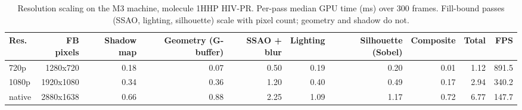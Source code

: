 \begin{table}[H]
    \centering
    \small
    \begin{tabular}{lrrrrrrrrr}
        \toprule
        Res. & FB pixels & Shadow map & Geometry (G-buffer) & SSAO + blur & Lighting & Silhouette (Sobel) & Composite & Total & FPS \\
        \midrule
        720p & 1280x720 & 0.18 & 0.07 & 0.50 & 0.19 & 0.20 & 0.01 & 1.12 & 891.5 \\
        1080p & 1920x1080 & 0.34 & 0.36 & 1.20 & 0.40 & 0.49 & 0.17 & 2.94 & 340.2 \\
        native & 2880x1638 & 0.66 & 0.88 & 2.25 & 1.09 & 1.17 & 0.72 & 6.77 & 147.7 \\
        \bottomrule
    \end{tabular}
    \caption{Resolution scaling on the M3 machine, molecule 1HHP HIV-PR. Per-pass median GPU time (ms) over 300 frames. Fill-bound passes (SSAO, lighting, silhouette) scale with pixel count; geometry and shadow do not.}
    \label{tab:resolution_m3}
\end{table}
